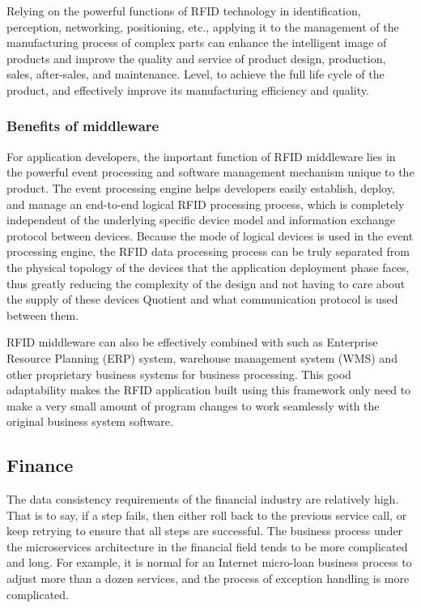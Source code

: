 \documentclass[conference]{IEEEtran}
\begin{document}
Relying on the powerful functions of RFID technology in identification, perception, networking, positioning, etc., applying it to the management of the manufacturing process of complex parts can enhance the intelligent image of products and improve the quality and service of product design, production, sales, after-sales, and maintenance. Level, to achieve the full life cycle of the product, and effectively improve its manufacturing efficiency and quality.

\subsubsection{Benefits of middleware}
For application developers, the important function of RFID middleware lies in the powerful event processing and software management mechanism unique to the product. The event processing engine helps developers easily establish, deploy, and manage an end-to-end logical RFID processing process, which is completely independent of the underlying specific device model and information exchange protocol between devices. Because the mode of logical devices is used in the event processing engine, the RFID data processing process can be truly separated from the physical topology of the devices that the application deployment phase faces, thus greatly reducing the complexity of the design and not having to care about the supply of these devices Quotient and what communication protocol is used between them.

RFID middleware can also be effectively combined with such as Enterprise Resource Planning (ERP) system, warehouse management system (WMS) and other proprietary business systems for business processing. This good adaptability makes the RFID application built using this framework only need to make a very small amount of program changes to work seamlessly with the original business system software.

\subsection{Finance}
The data consistency requirements of the financial industry are relatively high. That is to say, if a step fails, then either roll back to the previous service call, or keep retrying to ensure that all steps are successful. The business process under the microservices architecture in the financial field tends to be more complicated and long. For example, it is normal for an Internet micro-loan business process to adjust more than a dozen services, and the process of exception handling is more complicated.
\end{document}
